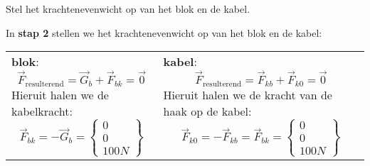 \documentclass{ximera}
\begin{document}
\begin{question}
\begin{hint}
\begin{hint}
\begin{enumerate}
\end{enumerate}

\end{hint}
\end{hint}
\begin{hint}
  Stel het krachtenevenwicht op van het blok en de kabel.
\begin{hint}
 In \textbf{stap 2} stellen we het krachtenevenwicht op van het blok en de kabel:

 \begin{tabular}{p{}|p{}}
 \textbf{blok}:\newline
 \begin{equation*}
 \vec{F}_{\textrm{resulterend}} = \vec G_b +  \vec F _{bk} = \vec 0
\end{equation*}
Hieruit halen we de kabelkracht:
\begin{equation*}
 \vec F _{bk} =  - \vec G_b =  \left\{\begin{array}{c} 0 \\ 0 \\ 100N \end{array}\right\}
\end{equation*}
&
 \textbf{kabel}:\newline
 \begin{equation*}
 \vec{F}_{\textrm{resulterend}} =  \vec F _{kb} + \vec F _{k0} = \vec 0
\end{equation*}
Hieruit halen we de kracht van de haak op de kabel:
\begin{equation*}
  \vec F _{k0} = -\vec F _{kb} =   \vec F _{bk} =  \left\{\begin{array}{c} 0 \\ 0 \\ 100N \end{array}\right\}
\end{equation*}
 \end{tabular}


\end{hint}
\end{hint}
\end{question}
\end{document}
